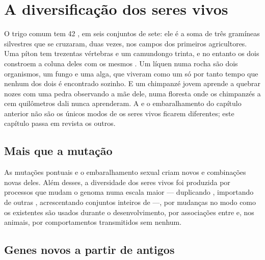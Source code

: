\chapter{A diversificação dos seres vivos}\label{ch:g12:diversification-of-life}

O trigo comum tem 42 , em seis conjuntos de sete: ele é a
soma de três gramíneas silvestres que se cruzaram, duas vezes, nos
campos dos primeiros agricultores. Uma píton tem trezentas vértebras e
um camundongo trinta, e no entanto os dois constroem a coluna deles com
os mesmos . Um líquen numa rocha são dois organismos, um fungo e
uma alga, que viveram como um só por tanto tempo que nenhum dos dois é
encontrado sozinho. E um chimpanzé jovem aprende a quebrar nozes com
uma pedra observando a mãe dele, numa floresta onde os chimpanzés a
cem quilômetros dali nunca aprenderam. A  e o embaralhamento do
capítulo anterior não são os únicos modos de os seres vivos ficarem
diferentes; este capítulo passa em revista os outros.

\section{Mais que a mutação}

\begin{proposition}\label{prop:g12:diversification-of-life:sources}
As mutações pontuais e o embaralhamento sexual criam  novos e
combinações novas deles. Além desses, a diversidade dos seres vivos foi
produzida por processos que mudam o genoma numa escala maior ---
duplicando , importando  de outras , acrescentando
conjuntos inteiros de  ---, por mudanças no modo como os
 existentes são usados durante o desenvolvimento, por associações
entre  e, nos animais, por comportamentos transmitidos sem 
nenhum.
\end{proposition}
\admitted

\section{Genes novos a partir de antigos}

